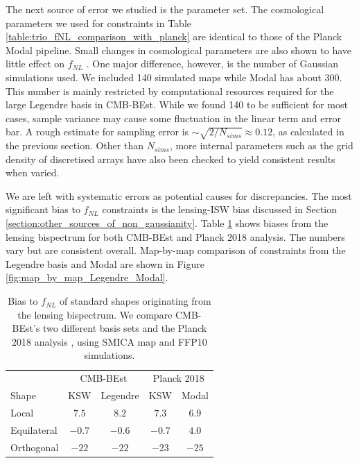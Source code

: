 The next source of error we studied is the parameter set. The cosmological parameters we used for constraints in Table \ref{table:trio_fNL_comparison_with_planck} are identical to those of the Planck Modal pipeline. Small changes in cosmological parameters are also shown to have little effect on $f_{NL}$ \cite{PlanckCollaboration2015,PlanckCollaboration2018}. One major difference, however, is the number of Gaussian simulations used. We included 140 simulated maps while Modal has about 300. This number is mainly restricted by computational resources required for the large Legendre basis in CMB-BEst. While we found 140 to be sufficient for most cases, sample variance may cause some fluctuation in the linear term and error bar. A rough estimate for sampling error is $\sim \sqrt{2/N_{sims}} \approx 0.12$, as calculated in the previous section. Other than $N_{sims}$, more internal parameters such as the grid density of discretised arrays have also been checked to yield consistent results when varied. 

We are left with systematic errors as potential causes for discrepancies. The most significant bias to $f_{NL}$ constraints is the lensing-ISW bias discussed in Section \ref{section:other_sources_of_non_gaussianity}. Table \ref{table:trio_lensing_bias_comparison_with_planck} shows biases from the lensing bispectrum \cite{Lewis2011lensing} for both CMB-BEst and Planck 2018 analysis. The numbers vary but are consistent overall. Map-by-map comparison of constraints from the Legendre basis and Modal are shown in Figure \ref{fig:map_by_map_Legendre_Modal}. 

\begin{table}[h]
	\caption{Bias to $f_{NL}$ of standard shapes originating from the lensing bispectrum. We compare CMB-BEst's two different basis sets and the Planck 2018 analysis \cite{PlanckCollaboration2018}, using SMICA map and FFP10 simulations. }
	\centering
	\label{table:trio_lensing_bias_comparison_with_planck}
	\renewcommand{\arraystretch}{1.5} 
	\begin{tabular}{lcccc}
		\toprule
		& \multicolumn{2}{c}{CMB-BEst} & \multicolumn{2}{c}{Planck 2018} \\ \cmidrule(lr){2-3} \cmidrule(lr){4-5}
		Shape & KSW &  Legendre &  KSW &  Modal \\
		\midrule
		
		Local & $7.5$ & $8.2$ & $7.3$ & $6.9$ \\
		Equilateral & $-0.7$ & $-0.6$ & $-0.7$ & $4.0$\\
		Orthogonal & $-22$ & $-22$ & $-23$ & $-25$ \\
		\bottomrule
	\end{tabular}
\end{table}

